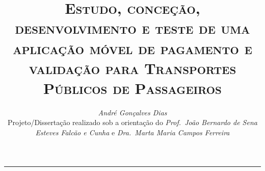 \documentclass[9pt,a4paper]{extarticle}
\begin{document}
\title{\vspace*{-8mm}\textbf{\textsc{Estudo, conceção, desenvolvimento e teste de uma aplicação móvel de pagamento e validação para Transportes Públicos de Passageiros}}}
\author{\emph{André Gonçalves Dias}\\[2mm]
\small{Projeto/Dissertação realizado sob a orientação do \emph{Prof.\ João Bernardo de Sena Esteves Falcão e Cunha} e \emph{Dra.\ Marta Maria Campos Ferreira}}}
\date{}
\maketitle
\thispagestyle{empty}

\vspace*{-4mm}\noindent\rule{\textwidth}{0.4pt}\vspace*{4mm}
\end{document}
